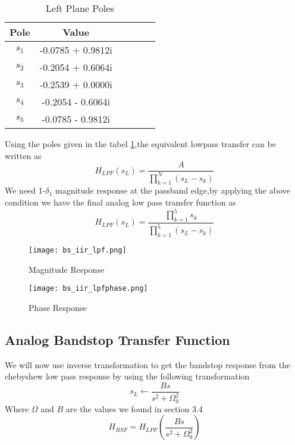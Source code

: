 \documentclass[12pt]{article}
\begin{document}
\begin{table}[h!]
		\begin{center}
		\caption{Left Plane Poles}
		\label{tab:t6}
		\begin{tabular}{|c|c|c|c|c|c|}
			\hline
			  Pole & Value \\
			\hline
			 $s_{1}$&   -0.0785 + 0.9812i\\
			\hline
			 $s_{2}$ &   -0.2054 + 0.6064i\\
			\hline
			 $s_{3}$ & -0.2539 + 0.0000i\\
			\hline
		     $s_{4}$ &  -0.2054 - 0.6064i\\
			\hline
		    $s_{5}$ &   -0.0785 - 0.9812i
		    \\
		    \hline
		\end{tabular}
		\end{center}
\end{table}
Using the poles given in the tabel \ref{tab:t6},the equivalent lowpass transfer can be written as\\
\begin{equation*}
   H_{LPF}(s_L) = \frac{A}{\prod_{k=1}^{N}(s_L-s_k)}
\end{equation*}
We need 1-$\delta_1$ magnitude response at the passband edge,by applying the above condition we have the final analog low pass transfer function as 
\begin{equation*}
     H_{LPF}(s_L) = \frac{\prod_{k=1}^{5}s_k}{\prod_{k=1}^{5}(s_L-s_k)}
\end{equation*}
\begin{figure}[H]
\centering
\texttt{[image: bs\_iir\_lpf.png]}
\caption{Magnitude Response}
\label{fig:mesh2}
\end{figure}

\begin{figure}[H]
\centering
\texttt{[image: bs\_iir\_lpfphase.png]}
\caption{Phase Response}
\label{fig:mesh2}
\end{figure}
\subsection{\textbf{Analog Bandstop Transfer Function}}
We will now use inverse transformation to get the bandstop response from the chebyshew low pass response by using the following transformation
\begin{equation*}
    s_L \longleftarrow \frac{Bs}{s^2+\Omega_0^2}
\end{equation*}
Where $\Omega$ and $B$ are the values we found in section 3.4\\
\begin{equation*}
    H_{BSF}=H_{LPF}(\frac{Bs}{s^2+\Omega_0^2}) 
\end{equation*}
\end{document}
